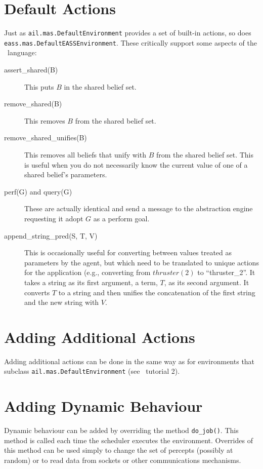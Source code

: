 \documentclass[a4]{article}
\begin{document}
\section{Default Actions}
Just as \texttt{ail.mas.DefaultEnvironment} provides a set of built-in actions, so does \texttt{eass.mas.DefaultEASSEnvironment}.  These critically support some aspects of the \eass\ language:

\begin{description}
\item[assert\_shared(B)] This puts $B$ in the shared belief set.
\item[remove\_shared(B)] This removes $B$ from the shared belief set.
\item[remove\_shared\_unifies(B)] This removes all beliefs that unify with $B$ from the shared belief set.  This is useful when you do not necessarily know the current value of one of a shared belief's parameters.
\item[perf(G) and query(G)] These are actually identical and send a message to the abstraction engine requesting it adopt $G$ as a perform goal.
\item[append\_string\_pred(S, T, V)] This is occasionally useful for converting between values treated as parameters by the agent, but which need to be translated to unique actions for the application (e.g., converting from $thruster(2)$ to ``thruster\_2''.  It takes a string as its first argument, a term, $T$, as its second argument.  It converts $T$ to a string and then unifies the concatenation of the first string and the new string with $V$.
\end{description}

\section{Adding Additional Actions}
Adding additional actions can be done in the same way as for environments that subclass \texttt{ail.mas.DefaultEnvironment} (see \ail\ tutorial 2).

\section{Adding Dynamic Behaviour}

Dynamic behaviour can be added by overriding the method \texttt{do\_job()}.  This method is called each time the scheduler executes the environment.  Overrides of this method can be used simply to change the set of percepts (possibly at random) or to read data from sockets or other communications mechanisms.
\end{document}
